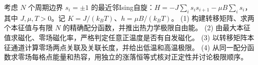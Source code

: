 考虑 \(N\) 个周期边界 \(s_i=\pm1\) 的最近邻Ising自旋：\(H=-J\sum_i s_is_{i+1}-\mu B\sum_i s_i\)，其中 \(J,\mu,T>0\)。记 \(K=J/(k_BT)\)、\(h=\mu B/(k_BT)\)。
(1) 构建转移矩阵、求两个本征值与有限 \(N\) 的精确配分函数，并推出热力学极限自由能。
(2) 由最大本征值求磁化、零场磁化率，严格判定任意正温度是否有自发磁化。
(3) 以转移矩阵本征通道计算零场两点关联及关联长度，并给出低温和高温极限。
(4) 从同一配分函数求零场每格点能量和热容，用独立的涨落恒等式核对正定性并讨论极限顺序。

